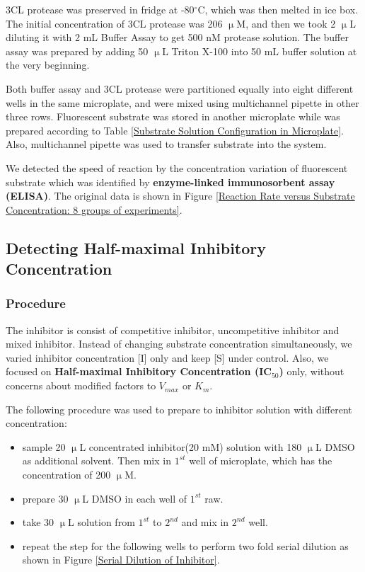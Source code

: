 \documentclass{report}
\begin{document}
3CL protease was preserved in fridge at -80$^\circ$C, which was then melted in ice box.
The initial concentration of 3CL protease was 206 $\upmu$M, and then we took 2 $\upmu$L diluting it with 2 mL Buffer Assay to get 500 nM protease solution.
The buffer assay was prepared by adding 50 $\upmu$L Triton X-100 into 50 mL buffer solution at the very beginning.

Both buffer assay and 3CL protease were partitioned equally into eight different wells in the same microplate, and were mixed using multichannel pipette in other three rows.
Fluorescent substrate was stored in another microplate while was prepared according to Table \ref{Substrate Solution Configuration in Microplate}.
Also, multichannel pipette was used to transfer substrate into the system.

We detected the speed of reaction by the concentration variation of fluorescent substrate which was identified by \textbf{enzyme-linked immunosorbent assay (ELISA)}.
The original data is shown in Figure \ref{Reaction Rate versus Substrate Concentration: 8 groups of experiments}.

\subsection{Detecting Half-maximal Inhibitory Concentration}
\subsubsection{Procedure}
The inhibitor is consist of competitive inhibitor, uncompetitive inhibitor and mixed inhibitor.
Instead of changing substrate concentration simultaneously, we varied inhibitor concentration [I] only and keep [S] under control.
Also, we focused on \textbf{Half-maximal Inhibitory Concentration (IC$_{50}$)} only, without concerns about modified factors to $V_{max}$ or $K_m$.

The following procedure was used to prepare to inhibitor solution with different concentration:

\begin{itemize}
    \item sample 20 $\upmu$L concentrated inhibitor(20 mM) solution with 180 $\upmu$L DMSO as additional solvent. Then mix in $1^{st}$ well of microplate, which has the concentration of 200 $\upmu$M.
    \item prepare 30 $\upmu$L DMSO in each well of $1^{st}$ raw.
    \item take 30 $\upmu$L solution from $1^{st}$ to $2^{nd}$ and mix in $2^{nd}$ well.
    \item repeat the step for the following wells to perform two fold serial dilution as shown in Figure \ref{Serial Dilution of Inhibitor}.
\end{itemize}
\end{document}
